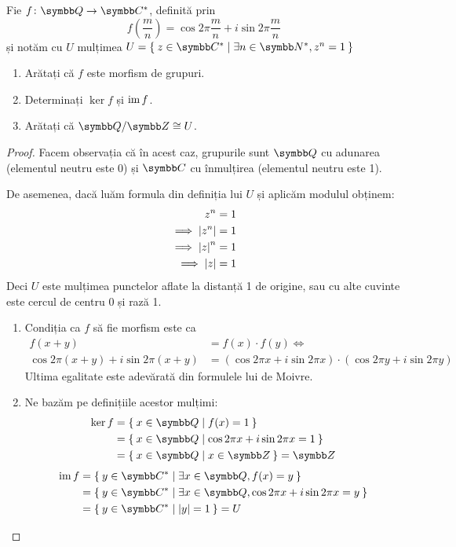 \begin{exercise}
Fie \(\function{f}{\rationals}{\complex^*}\), definită prin
\[
    f(\frac{m}{n}) = \cos 2\pi \frac{m}{n} + i \sin 2 \pi \frac{m}{n}
\]
și notăm cu \(U\) mulțimea \(U = \Set{ z \in \complex^* | \exists n \in \naturals^*, z^n = 1 }\)

\begin{enumerate}
    \item Arătați că \(f\) este morfism de grupuri.
    \item Determinați \(\ker f\) și \(\operatorname{im} f\).
    \item Arătați că \(\rationals / \integers \cong U\).
\end{enumerate}
\end{exercise}
\begin{proof}
Facem observația că în acest caz, grupurile sunt \(\rationals\) cu adunarea (elementul neutru este 0) și \(\complex\) cu înmulțirea (elementul neutru este 1).

De asemenea, dacă luăm formula din definiția lui \(U\) și aplicăm modulul obținem:
\begin{align*}
    z^n &= 1 \\
    \implies \left\lvert z^n \right\rvert &= 1 \\
    \implies \left\lvert z \right\rvert^n &= 1 \\
    \implies \left\lvert z \right\rvert &= 1
\end{align*}
Deci \(U\) este mulțimea punctelor aflate la distanță 1 de origine, sau cu alte cuvinte este cercul de centru 0 și rază 1.

\begin{enumerate}
    \item Condiția ca \(f\) să fie morfism este ca
    \begin{align*}
        f(x + y) &= f(x) \cdot f(y) \iff \\
        \cos 2 \pi (x + y) + i \sin 2 \pi (x + y) &= (\cos 2 \pi x + i \sin 2 \pi x) \cdot (\cos 2 \pi y + i \sin 2 \pi y)
    \end{align*}
    Ultima egalitate este adevărată din formulele lui de Moivre.

    \item Ne bazăm pe definițiile acestor mulțimi:
    \begin{align*}
        \ker f &= \Set{ x \in \rationals | f(x) = 1 } \\
        &= \Set{ x \in \rationals | \cos 2 \pi x + i \sin 2 \pi x = 1 } \\
        &= \Set{ x \in \rationals | x \in \integers } = \integers
    \end{align*}
    \begin{align*}
        \im f &= \Set{ y \in \complex^* | \exists x \in \rationals, f(x) = y } \\
        &= \Set{ y \in \complex^* | \exists x \in \rationals, \cos 2 \pi x + i \sin 2 \pi x = y } \\
        &= \Set{ y \in \complex^* | \abs{y} = 1 } = U
    \end{align*}


\end{enumerate}
\end{proof}
